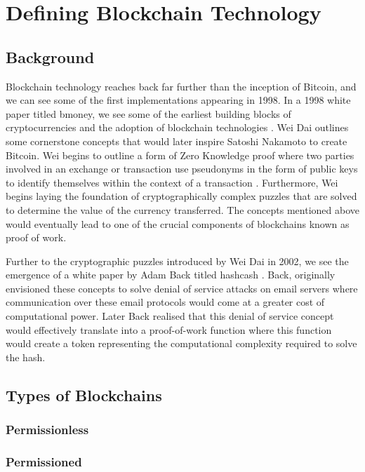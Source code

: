 \section{Defining Blockchain Technology}

\subsection{Background}

Blockchain technology reaches back far further than the inception of Bitcoin, and we can see some of the first implementations appearing in 1998.
In a 1998 white paper titled bmoney, we see some of the earliest building blocks of cryptocurrencies and the adoption of blockchain technologies \autocite{daiBmoney1998}.
Wei Dai outlines some cornerstone concepts that would later inspire Satoshi Nakamoto to create Bitcoin. Wei begins to outline a form of Zero Knowledge proof where two parties involved in an exchange or transaction use pseudonyms in the form of public keys to identify themselves within the context of a transaction \autocite{ZeroknowledgeProofsEthereum2022}. Furthermore, Wei begins laying the foundation of cryptographically complex puzzles that are solved to determine the value of the currency transferred. The concepts mentioned above would eventually lead to one of the crucial components of blockchains known as proof of work.\par
Further to the cryptographic puzzles introduced by Wei Dai in 2002, we see the emergence of a white paper by Adam Back titled hashcash \autocite{backHashcashDenialService2002}. Back, originally envisioned these concepts to solve denial of service attacks on email servers where communication over these email protocols would come at a greater cost of computational power. Later Back realised that this denial of service concept would effectively translate into a proof-of-work function where this function would create a token representing the computational complexity required to solve the hash.


\subsection{Types of Blockchains}

\subsubsection{Permissionless}

\subsubsection{Permissioned}

